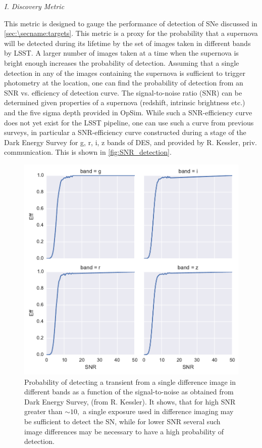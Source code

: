 \emph{I. Discovery Metric}

This metric is designed to gauge the performance of detection of SNe 
discussed in \autoref{sec:\secname:targets}.
This metric is a proxy for the probability that a supernova will be detected
 during its lifetime by the set of images taken in different bands by LSST. A larger
 number of images taken at a time when the supernova is bright enough increases the
 probability of detection. Assuming that a single detection in any of the images containing
 the supernova is sufficient to trigger photometry at the location, one can find the
 probability of detection from an SNR vs. efficiency of detection curve. The signal-to-noise ratio 
(SNR) can be determined given properties of a supernova (redshift, intrinsic brightness etc.)
 and the five sigma depth provided in OpSim. While such a SNR-efficiency curve does not
 yet exist for the LSST pipeline, one can use such a curve from previous surveys, in particular a
 SNR-efficiency curve constructed during a stage of the Dark Energy Survey for g, r, i, z bands of DES,
 and provided by R. Kessler, priv. communication. This is shown in \autoref{fig:SNR_detection}.
\begin{figure}
 \centering
 \includegraphics[width=\textwidth]{figs/supernova/SNR_detection.pdf}
 \caption{Probability of detecting a transient from a single difference image in different bands as 
a
 function of the signal-to-noise as obtained from Dark Energy Survey, (from R. Kessler). It shows, 
that 
for high SNR greater than $\sim 10,$ a single exposure used in difference imaging may be sufficient to detect the SN, while for 
lower SNR several such image differences may be necessary to have a high probability of detection.}
 \label{fig:SNR_detection}
\end{figure}

